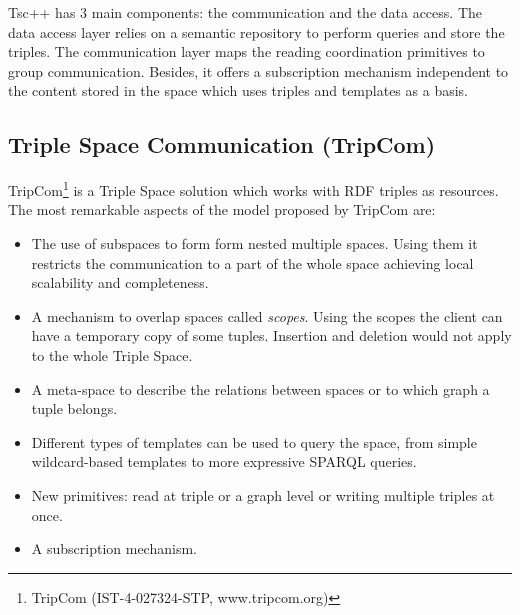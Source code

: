 Tsc++ has 3 main components: the communication and the data access.
The data access layer relies on a semantic repository to perform queries and store the triples.
The communication layer maps the reading coordination primitives to group communication.
Besides, it offers a subscription mechanism independent to the content stored in the space which uses triples and templates as a basis.





\subsection{Triple Space Communication (TripCom)}

TripCom\footnote{TripCom (IST-4-027324-STP, www.tripcom.org)} is a Triple Space solution which works with RDF triples as resources.
The most remarkable aspects of the model proposed by TripCom are:
\begin{itemize}
  \item The use of subspaces to form form nested multiple spaces.
	Using them it restricts the communication to a part of the whole space achieving local scalability and completeness.
  \item A mechanism to overlap spaces called \emph{scopes}.
	Using the scopes the client can have a temporary copy of some tuples.
	Insertion and deletion would not apply to the whole Triple Space.
  \item A meta-space to describe the relations between spaces or to which graph a tuple belongs.
  \item Different types of templates can be used to query the space, from simple wildcard-based templates to more expressive SPARQL queries.
  \item New primitives: read at triple or a graph level or writing multiple triples at once.
  \item A subscription mechanism.
\end{itemize}


